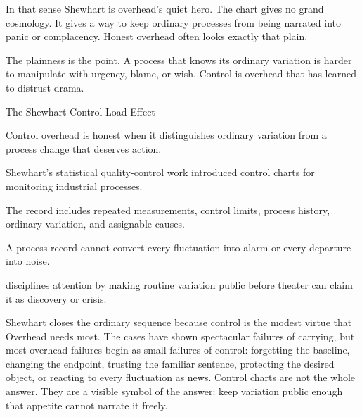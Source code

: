 In that sense Shewhart is overhead's quiet hero. The chart gives no grand
cosmology. It gives a way to keep ordinary processes from being narrated into
panic or complacency. Honest overhead often looks exactly that plain.

The plainness is the point. A process that knows its ordinary variation is
harder to manipulate with urgency, blame, or wish. Control is overhead that
has learned to distrust drama.

\begin{phenom}{The Shewhart Control-Load Effect~\cite{shewhart1931}}
\label{ph:shewhart-control-load}

\PhStatement
Control overhead is honest when it distinguishes ordinary variation from a
process change that deserves action.

\PhOrigin
Shewhart's statistical quality-control work introduced control charts for
monitoring industrial processes.

\PhObservation
The record includes repeated measurements, control limits, process history,
ordinary variation, and assignable causes.

\PhConstraint
A process record cannot convert every fluctuation into alarm or every
departure into noise.

\PhConsequence
{} disciplines attention by making routine variation public before
theater can claim it as discovery or crisis.
\end{phenom}

Shewhart closes the ordinary sequence because control is the modest virtue
that Overhead needs most. The cases have shown spectacular failures of
carrying, but most overhead failures begin as small failures of control:
forgetting the baseline, changing the endpoint, trusting the familiar
sentence, protecting the desired object, or reacting to every fluctuation as
news. Control charts are not the whole answer. They are a visible symbol of
the answer: keep variation public enough that appetite cannot narrate it
freely.

